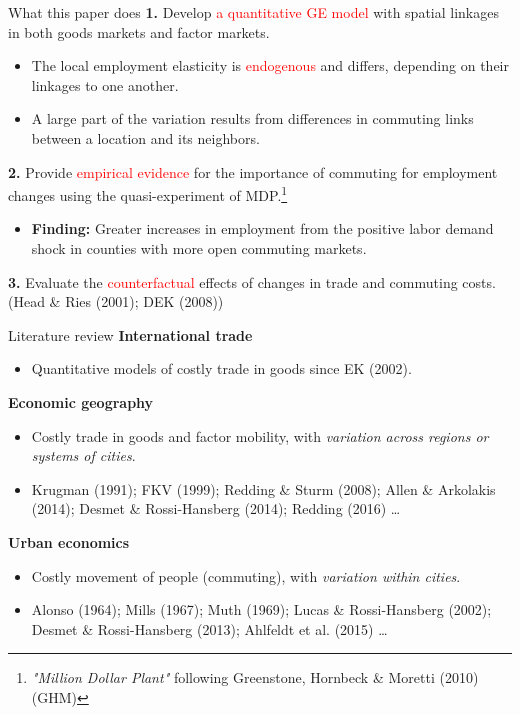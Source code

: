 \documentclass{beamer}
\begin{document}
\begin{frame}{What this paper does}
	\textbf{1.} Develop \textcolor{red}{a quantitative GE model} with spatial linkages in both goods markets and factor markets.
	\begin{itemize}
		\item The local employment elasticity is \textcolor{red}{endogenous} and differs, depending on their linkages to one another.
		\item A large part of the variation results from differences in commuting links between a location and its neighbors.
	\end{itemize}
	\medskip

	\textbf{2.} Provide \textcolor{red}{empirical evidence} for the importance of commuting for employment changes using the quasi-experiment of MDP.\footnote{\textit{"Million Dollar Plant"} following Greenstone, Hornbeck \& Moretti (2010) (GHM)}
	\begin{itemize}
		\item \textbf{Finding:} Greater increases in employment from the positive labor demand shock in counties with more open commuting markets.
	\end{itemize}
	\medskip

	\textbf{3.} Evaluate the \textcolor{red}{counterfactual} effects of changes in trade and commuting costs. (Head \& Ries (2001); DEK (2008))
\end{frame}
\begin{frame}{Literature review}
	\textbf{International trade}
	\begin{itemize}
		\item Quantitative models of costly trade in goods since EK (2002).
	\end{itemize}
	\medskip

	\textbf{Economic geography}
	\begin{itemize}
		\item Costly trade in goods and factor mobility, with \textit{variation across regions or systems of cities}.
		\item {\small Krugman (1991); FKV (1999); Redding \& Sturm (2008); Allen \& Arkolakis (2014); Desmet \& Rossi-Hansberg (2014); Redding (2016) \dots}
	\end{itemize}
	\medskip

	\textbf{Urban economics}
	\begin{itemize}
		\item Costly movement of people (commuting), with \textit{variation within cities}.
		\item {\small Alonso (1964); Mills (1967); Muth (1969); Lucas \& Rossi-Hansberg (2002); Desmet \& Rossi-Hansberg (2013); Ahlfeldt et al. (2015) \dots}
	\end{itemize}
\end{frame}
\end{document}
